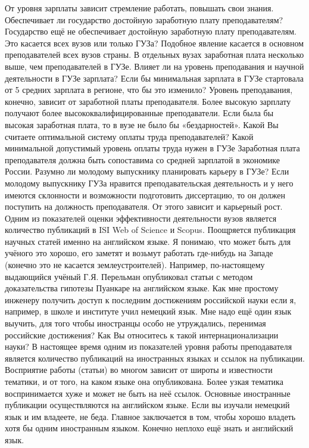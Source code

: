 \begin{drama}
	\michaelspeaks От уровня зарплаты зависит стремление работать, повышать свои знания.
	\maxspeaks Обеспечивает ли государство достойную заработную плату преподавателям? 
	\michaelspeaks Государство ещё не обеспечивает достойную заработную плату преподавателям. 
	\maxspeaks Это касается всех вузов или только ГУЗа?
	\michaelspeaks Подобное явление касается в основном преподавателей всех вузов страны. В отдельных вузах заработная плата несколько выше, чем преподавателей в ГУЗе.
	\maxspeaks Влияет ли на уровень преподавания и научной деятельности в ГУЗе зарплата? Если бы минимальная зарплата в ГУЗе стартовала от 5 средних зарплата в регионе, что бы это изменило?
	\michaelspeaks Уровень преподавания, конечно, зависит от заработной платы преподавателя. Более высокую зарплату получают более высококвалифицированные преподаватели. Если была бы высокая заработная плата, то в вузе не было бы «бездарностей».
	\maxspeaks Какой Вы считаете оптимальной систему оплаты труда преподавателей? Какой минимальной допустимый уровень оплаты труда нужен в ГУЗе
	\michaelspeaks Заработная плата преподавателя должна быть сопоставима со средней зарплатой в экономике России.
	\maxspeaks Разумно ли молодому выпускнику планировать карьеру в ГУЗе?
	\michaelspeaks Если молодому выпускнику ГУЗа нравится преподавательская деятельность и у него имеются склонности и возможности подготовить диссертацию, то он должен поступить на должность преподавателя. От этого зависит и карьерный рост.
	\maxspeaks Одним из показателей оценки эффективности деятельности вузов является количество публикаций в ISI Web of Science и Scopus. Поощряется публикация научных статей именно на английском языке. Я понимаю, что может быть для учёного это хорошо, его заметят и возьмут работать где-нибудь на Западе (конечно это не касается землеустроителей). Например, по-настоящему выдающийся учёный Г.Я. Перельман опубликовал статьи с методом доказательства гипотезы Пуанкаре на английском языке. Как мне простому инженеру получить доступ к последним достижениям российской науки если я, например, в школе и институте учил немецкий язык. Мне надо ещё один язык выучить, для того чтобы иностранцы особо не утруждались, перенимая российские достижения? Как Вы относитесь к такой интернационализации науки?
	\michaelspeaks В настоящее время одним из показателей уровня работы преподавателя является количество публикаций на иностранных языках и ссылок на публикации. Восприятие работы (статьи) во многом зависит от широты и известности тематики, и от того, на каком языке она опубликована. Более узкая тематика воспринимается хуже и может не быть на неё ссылок. Основные иностранные публикации осуществляются на английском языке. Если вы изучали немецкий язык и им владеете, не беда. Главное заключается в том, чтобы хорошо владеть хотя бы одним иностранным языком. Конечно неплохо ещё знать и английский язык.

\end{drama}
